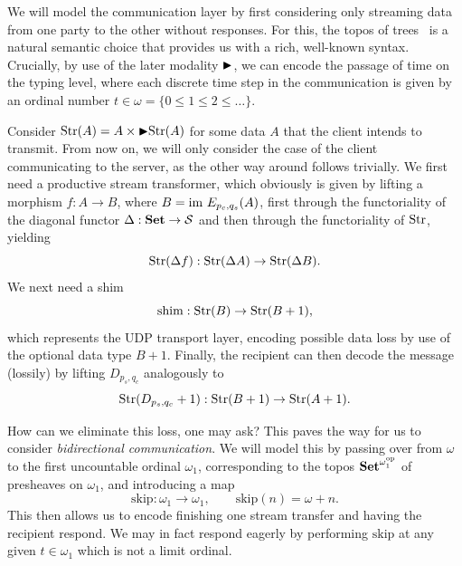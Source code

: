We will model the communication layer by first considering only streaming data from one party to the other without responses.
For this, the topos of trees~\cite{birkedalFirstStepsSynthetic2012} is a natural semantic choice that provides us with a rich, well-known syntax.
Crucially, by use of the later modality $\mathord{\blacktriangleright}$, we can encode the passage of time on the typing level, where each discrete time step in the communication is given by an ordinal number $t \in \omega = \{0 \le 1 \le 2 \le \dots\}$.

Consider $\mathrm{Str}(A) = A \times \mathord{\blacktriangleright} \mathrm{Str}(A)$ for some data $A$ that the client intends to transmit.
From now on, we will only consider the case of the client communicating to the server, as the other way around follows trivially.
We first need a productive stream transformer, which obviously is given by lifting a morphism $f : A \to B$, where $B = \text{im } E_{p_c, q_s}(A)$, first through the functoriality of the diagonal functor $\Delta : \mathbf{Set} \to \mathcal{S}$ and then through the functoriality of $\mathrm{Str}$, yielding
\[
	\mathrm{Str}(\Delta f) : \mathrm{Str}(\Delta A) \to \mathrm{Str}(\Delta B).
\]
We next need a shim
\[
	\mathrm{shim} : \mathrm{Str}(B) \to \mathrm{Str}(B + 1),
\]
which represents the UDP transport layer, encoding possible data loss by use of the optional data type $B + 1$.
Finally, the recipient can then decode the message (lossily) by lifting $D_{p_s, q_c}$ analogously to
\[
	\mathrm{Str}(D_{p_s, q_c} + 1) : \mathrm{Str}(B + 1) \to \mathrm{Str}(A + 1).
\]

How can we eliminate this loss, one may ask?
This paves the way for us to consider \emph{bidirectional communication}.
We will model this by passing over from $\omega$ to the first uncountable ordinal $\omega_1$, corresponding to the topos $\mathbf{Set}^{\omega_1^{\mathrm{op}}}$ of presheaves on $\omega_1$, and introducing a map
\[
	\mathrm{skip} : \omega_1 \to \omega_1, \qquad \mathrm{skip}(n) = \omega + n.
\]
This then allows us to encode finishing one stream transfer and having the recipient respond.
We may in fact respond eagerly by performing $\mathrm{skip}$ at any given $t \in \omega_1$ which is not a limit ordinal.
